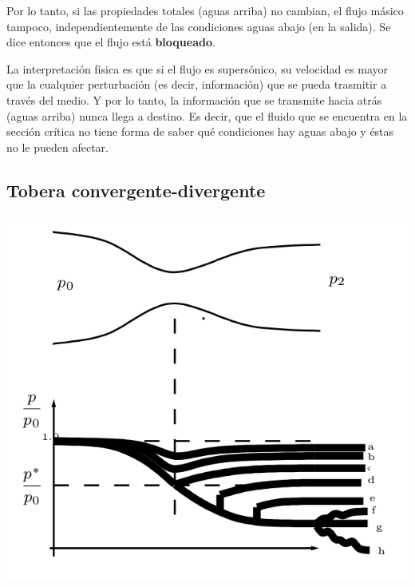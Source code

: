 	Por lo tanto, si las propiedades totales (aguas arriba) no cambian,
	el flujo másico tampoco, independientemente de las condiciones aguas
	abajo (en la salida). Se dice entonces que el flujo está \textbf{bloqueado}.

	
	La interpretación física es que si el flujo es supersónico, su velocidad
	es mayor que la cualquier perturbación (es decir, información) que
	se pueda trasmitir a través del medio. Y por lo tanto, la información
	que se transmite hacia atrás (aguas arriba) nunca llega a destino.
	Es decir, que el fluido que se encuentra en la sección crítica no
	tiene forma de saber qué condiciones hay aguas abajo y éstas no le
	pueden afectar.
	
	\begin{center}
		\par\end{center}
	


\subsection{Tobera convergente-divergente}

\begin{center}
	\includegraphics[width=0.7\linewidth]{TeX_files/chapter11-Compresible/tobera_convergente_divergente}
\end{center}

